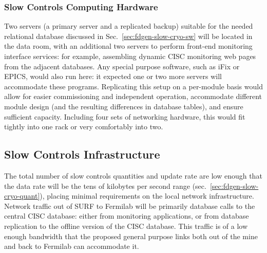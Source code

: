 \subsubsection{Slow Controls Computing Hardware}
\label{sec:fdgen-slow-cryo-slow-compute}

Two servers (a primary server and a replicated backup) suitable for the needed relational database discussed
in Sec.~\ref{sec:fdgen-slow-cryo-sw} will be located in the  data
room, with an additional
two servers to perform front-end monitoring interface services: for
example, assembling dynamic CISC monitoring web pages from the adjacent
databases.  Any special purpose software, such as iFix or EPICS, would
also run here: it expected one or two more servers will accommodate
these programs.
Replicating this setup on a per-module basis would allow for easier
commissioning and independent operation, accommodate different module
design (and the resulting differences in database tables), and ensure
sufficient capacity.  Including four sets of networking hardware, this
would fit tightly into one rack or very comfortably into two.





\subsection{Slow Controls Infrastructure}
\label{sec:fdgen-slow-cryo-slow-infra}

The total number of slow controls quantities and update rate are low enough
that the data rate will be the tens of kilobytes per second range
(sec.~\ref{sec:fdgen-slow-cryo-quant}), placing minimal requirements
on the local network infrastructure.
Network traffic out of SURF to Fermilab will be primarily database calls
to the central CISC database: either from monitoring applications, or from
database replication to the offline version of the CISC database.  This
traffic is of a low enough bandwidth that the proposed general purpose
links both out of the mine and back to Fermilab can accommodate it.


